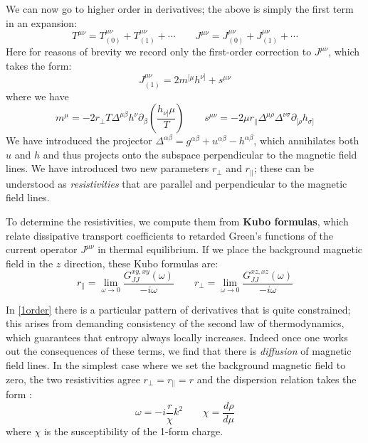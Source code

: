 \documentclass[aps,preprint,nofootinbib,preprintnumbers,eqsecnum,superscriptaddress]{revtex4}
\newcommand{\be}{\begin{equation}}
\newcommand{\ee}{\end{equation}}
\def\le{\left}
\def\ri{\right}
\def\al{{\alpha}}
\newcommand{\p}{\partial}
\newcommand\sig{\sigma}
\newcommand\om{\omega}
\numberwithin{equation}{section}
\begin{document}
We can now go to higher order in derivatives; the above is simply the first term in an expansion: 
\be
T^{\mu\nu} = T^{\mu\nu}_{(0)} + T^{\mu\nu}_{(1)} + \cdots \qquad J^{\mu\nu} = J^{\mu\nu}_{(0)} + J^{\mu\nu}_{(1)} + \cdots
\ee
Here for reasons of brevity we record only the first-order correction to $J^{\mu\nu}$, which takes the form: 
\be
J^{\mu\nu}_{(1)} = 2 m^{[\mu} h^{\nu]} + s^{\mu\nu}
\ee
where we have
\be
m^{\mu} = -2 r_{\perp} T \Delta^{\mu\beta} h^{\nu} \p_{\beta} \le(\frac{h_{\nu]}\mu}{T}\ri) \qquad s^{\mu\nu} = -2 \mu r_{\parallel} \Delta^{\mu\rho} \Delta^{\nu\sig} \p_{[\rho} h_{\sigma]}  \label{1order} 
\ee
We have introduced the projector $\Delta^{\al\beta} = g^{\al\beta} + u^{\al\beta} - h^{\al\beta}$, which annihilates both $u$ and $h$ and thus projects onto the subspace perpendicular to the magnetic field lines. We have introduced two new parameters $r_{\perp}$ and $r_{\parallel}$; these can be understood as {\it resistivities} that are parallel and perpendicular to the magnetic field lines. 

To determine the resistivities, we compute them from {\bf Kubo formulas}, which relate dissipative transport coefficients to retarded Green's functions of the current operator $J^{\mu\nu}$ in thermal equilibrium. If we place the background magnetic field in the $z$ direction, these Kubo formulas are: 
\be
r_{\parallel} = \lim_{\om \to 0} \frac{G^{xy,xy}_{JJ}(\om)}{-i\om} \qquad r_{\perp} = \lim_{\om \to 0} \frac{G^{xz,xz}_{JJ}(\om)}{-i\om}
\ee 

In \eqref{1order} there is a particular pattern of derivatives that is quite constrained; this arises from demanding consistency of the second law of thermodynamics, which guarantees that entropy always locally increases. Indeed once one works out the consequences of these terms, we find that there is {\it diffusion} of magnetic field lines. In the simplest case where we set the background magnetic field to zero, the two resistivities agree $r_{\perp} = r_{\parallel} = r$ and the dispersion relation takes the form \cite{Hofman:2017vwr}: 
\be
\om = -i \frac{r}{\chi} k^2 \qquad \chi = \frac{d\rho}{d\mu} \label{disprel} 
\ee 
where $\chi$ is the susceptibility of the 1-form charge. 
\end{document}
